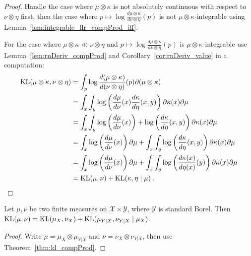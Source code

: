 \begin{proof}
Handle the case where $\mu \otimes \kappa$ is not absolutely continuous with respect to  $\nu \otimes \eta$ first, then the case where $p \mapsto \log \frac{d \mu \otimes \kappa}{d \nu \otimes \eta}(p)$ is not $\mu \otimes \kappa$-integrable using Lemma~\ref{lem:integrable_llr_compProd_iff}.

For the case where $\mu \otimes \kappa \ll \nu \otimes \eta$ and $p \mapsto \log \frac{d \mu \otimes \kappa}{d \nu \otimes \eta}(p)$ is $\mu \otimes \kappa$-integrable use Lemma~\ref{lem:rnDeriv_compProd} and Corollary~\ref{cor:rnDeriv_value} in a computation:
\begin{align*}
\operatorname{KL}(\mu \otimes \kappa, \nu \otimes \eta)
&= \int_p \log \frac{d(\mu \otimes \kappa)}{d(\nu \otimes \eta)}(p) \partial (\mu \otimes \kappa)
\\
&= \int_x \int_y\log \left(\frac{d\mu}{d \nu}(x)\frac{d\kappa}{d \eta}(x,y)\right) \partial \kappa(x) \partial\mu
\\
&= \int_x \int_y\log \left(\frac{d\mu}{d \nu}(x)\right) + \log \left(\frac{d\kappa}{d \eta}(x,y)\right) \partial \kappa(x) \partial\mu
\\
&= \int_x \log \left(\frac{d\mu}{d \nu}(x)\right)\partial\mu + \int_x \int_y\log \left(\frac{d\kappa}{d \eta}(x,y)\right) \partial \kappa(x) \partial\mu
\\
&= \int_x \log \left(\frac{d\mu}{d \nu}(x)\right)\partial\mu + \int_x \int_y\log \left(\frac{d\kappa(x)}{d \eta(x)}(y)\right) \partial \kappa(x) \partial\mu
\\
&= \operatorname{KL}(\mu, \nu) + \operatorname{KL}(\kappa, \eta \mid \mu)
\: .
\end{align*}

\end{proof}

\begin{theorem}
  \label{thm:kl_chain_rule_prod}
  \leanok
  Let $\mu, \nu$ be two finite measures on $\mathcal X \times \mathcal Y$, where $\mathcal Y$ is standard Borel.
  Then $\operatorname{KL}(\mu, \nu) = \operatorname{KL}(\mu_X, \nu_X) + \operatorname{KL}(\mu_{Y|X}, \nu_{Y|X} \mid \mu_X)$.
\end{theorem}

\begin{proof}
Write $\mu = \mu_X \otimes \mu_{Y|X}$ and $\nu = \nu_X \otimes \nu_{Y|X}$, then use Theorem~\ref{thm:kl_compProd}.
\end{proof}

